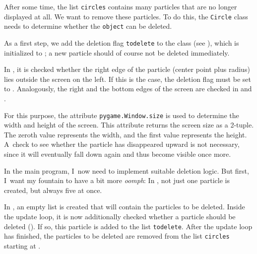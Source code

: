 
\begin{figure}%
	\begin{center}%
		\vspace{-1cm}%
	\end{center}%
\end{figure}%
After some time, the list \texttt{circles} contains many particles that are no longer displayed at all. We want to remove these particles. To do this, the \texttt{Circle} class needs to determine whether the \texttt{object} can be deleted. 

As a first step, we add the deletion flag \texttt{todelete} to the class (see ), which is initialized to \false; a new particle should of course not be deleted immediately.

In , it is checked whether the right edge of the particle (center point plus radius) lies outside the screen on the left. If this is the case, the deletion flag must be set to \true. Analogously, the right and the bottom edges of the screen are checked in  and .

For this purpose, the attribute \texttt{pygame.Window.size} is used to determine the width and height of the screen. This attribute returns the screen size as a 2-tuple.
The zeroth value represents the width, and the first value represents the height. A~check to see whether the particle has disappeared upward is not necessary, since it will eventually fall down again and thus become visible once more.


In the main program, I~now need to implement suitable deletion logic. But first, I~want my fountain to have a bit more \emph{oomph}: In , not just one particle is created, but always five at once.

In , an empty list is created that will contain the particles to be deleted. Inside the update loop, it is now additionally checked whether a particle should be deleted (). If so, this particle is added to the list \texttt{todelete}. After the update loop has finished, the particles to be deleted are removed from the list \texttt{circles} starting at .

